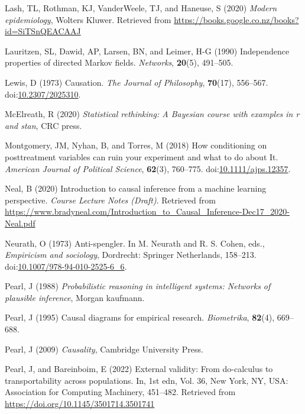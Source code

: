 \documentclass[
  single column]{article}
\newlength{\cslhangindent}
\newenvironment{CSLReferences}[2] %
 {\begin{list}{}{%
  \setlength{\itemindent}{0pt}
  \setlength{\leftmargin}{0pt}
  \setlength{\parsep}{0pt}
  \ifodd #1
   \setlength{\leftmargin}{\cslhangindent}
   \setlength{\itemindent}{-1\cslhangindent}
  \fi
  \setlength{\itemsep}{#2\baselineskip}}}
 {\end{list}}
\begin{document}
\begin{CSLReferences}{1}{0}
Lash, TL, Rothman, KJ, VanderWeele, TJ, and Haneuse, S (2020)
\emph{Modern epidemiology}, Wolters Kluwer. Retrieved from
\url{https://books.google.co.nz/books?id=SiTSnQEACAAJ}

Lauritzen, SL, Dawid, AP, Larsen, BN, and Leimer, H-G (1990)
Independence properties of directed {M}arkov fields. \emph{Networks},
\textbf{20}(5), 491--505.

Lewis, D (1973) Causation. \emph{The Journal of Philosophy},
\textbf{70}(17), 556--567.
doi:\href{https://doi.org/10.2307/2025310}{10.2307/2025310}.

McElreath, R (2020) \emph{Statistical rethinking: A {B}ayesian course
with examples in r and stan}, CRC press.

Montgomery, JM, Nyhan, B, and Torres, M (2018) How conditioning on
posttreatment variables can ruin your experiment and what to do about
It. \emph{American Journal of Political Science}, \textbf{62}(3),
760--775.
doi:\href{https://doi.org/10.1111/ajps.12357}{10.1111/ajps.12357}.

Neal, B (2020) Introduction to causal inference from a machine learning
perspective. \emph{Course Lecture Notes (Draft)}. Retrieved from
\url{https://www.bradyneal.com/Introduction_to_Causal_Inference-Dec17_2020-Neal.pdf}

Neurath, O (1973) Anti-spengler. In M. Neurath and R. S. Cohen, eds.,
\emph{Empiricism and sociology}, Dordrecht: Springer Netherlands,
158--213.
doi:\href{https://doi.org/10.1007/978-94-010-2525-6_6}{10.1007/978-94-010-2525-6\_6}.

Pearl, J (1988) \emph{Probabilistic reasoning in intelligent systems:
Networks of plausible inference}, Morgan kaufmann.

Pearl, J (1995) Causal diagrams for empirical research.
\emph{Biometrika}, \textbf{82}(4), 669--688.

Pearl, J (2009) \emph{Causality}, Cambridge University Press.

Pearl, J, and Bareinboim, E (2022) External validity: From do-calculus
to transportability across populations. In, 1st edn, Vol. 36, New York,
NY, USA: Association for Computing Machinery, 451--482. Retrieved from
\url{https://doi.org/10.1145/3501714.3501741}


\end{CSLReferences}
\end{document}
